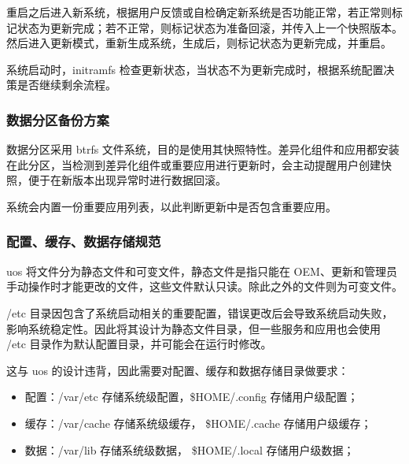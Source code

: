 \documentclass{utart}
\begin{document}
重启之后进入新系统，根据用户反馈或自检确定新系统是否功能正常，若正常则标记状态为更新完成；若不正常，则标记状态为准备回滚，并传入上一个快照版本。
然后进入更新模式，重新生成系统，生成后，则标记状态为更新完成，并重启。

系统启动时，initramfs 检查更新状态，当状态不为更新完成时，根据系统配置决策是否继续剩余流程。

\subsubsection{数据分区备份方案}
数据分区采用 btrfs 文件系统，目的是使用其快照特性。差异化组件和应用都安装在此分区，当检测到差异化组件或重要应用进行更新时，会主动提醒用户创建快照，便于在新版本出现异常时进行数据回滚。

系统会内置一份重要应用列表，以此判断更新中是否包含重要应用。

\subsubsection{配置、缓存、数据存储规范}
uos 将文件分为静态文件和可变文件，静态文件是指只能在 OEM、更新和管理员手动操作时才能更改的文件，这些文件默认只读。除此之外的文件则为可变文件。

/etc 目录因包含了系统启动相关的重要配置，错误更改后会导致系统启动失败，影响系统稳定性。因此将其设计为静态文件目录，但一些服务和应用也会使用 /etc 目录作为默认配置目录，并可能会在运行时修改。

这与 uos 的设计违背，因此需要对配置、缓存和数据存储目录做要求：
\begin{itemize}
\item 配置：/var/etc 存储系统级配置，\$HOME/.config 存储用户级配置；
\item 缓存：/var/cache 存储系统级缓存， \$HOME/.cache 存储用户级缓存；
\item 数据：/var/lib 存储系统级数据， \$HOME/.local 存储用户级数据；
\end{itemize}
\end{document}
